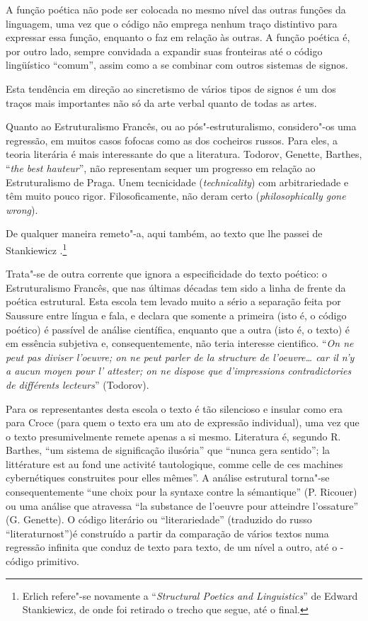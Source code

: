 A função poética não pode ser colocada no mesmo nível das outras funções
da linguagem, uma vez que o código não emprega nenhum traço distintivo
para expressar essa função, enquanto o faz em relação às outras. A
função poética é, por outro lado, sempre convidada a expandir suas
fronteiras até o código lingüístico ``comum'', assim como a se combinar
com outros sistemas de signos.

Esta tendência em direção ao sincretismo de vários tipos de signos é um
dos traços mais importantes não só da arte verbal quanto de todas as
artes.

Quanto ao Estruturalismo Francês, ou ao pós"-estruturalismo, considero"-os
uma regressão, em muitos casos fofocas como as dos cocheiros russos.
Para eles, a teoria literária é mais interessante do que a literatura.
Todorov, Genette, Barthes, ``\emph{the best hauteur}'', não representam
sequer um progresso em relação ao Estruturalismo de Praga. Unem
tecnicidade (\emph{technicality}) com arbitrariedade e têm muito pouco
rigor. Filosoficamente, não deram certo (\emph{philosophically gone
wrong}).

De qualquer maneira remeto"-a, aqui também, ao texto que lhe passei de
Stankiewicz .\footnote{Erlich refere"-se novamente a ``\emph{Structural
  Poetics and Linguistics}'' de Edward Stankiewicz, de onde foi retirado
  o trecho que segue, até o final.}

Trata"-se de outra corrente que ignora a especificidade do texto poético:
o Estruturalismo Francês, que nas últimas décadas tem sido a linha de
frente da poética estrutural. Esta escola tem levado muito a sério a
separação feita por Saussure entre língua e fala, e declara que somente
a primeira (isto é, o código poético) é passível de análise científica,
enquanto que a outra (isto é, o texto) é em essência subjetiva e,
consequentemente, não teria interesse cientifico. ``\emph{On ne peut pas
diviser l'oeuvre; on ne peut parler de la structure de l'oeuvre\ldots{}
car il n'y a aucun moyen pour l' attester; on ne dispose que
d'impressions contradictories de différents lecteurs}'' (Todorov).

Para os representantes desta escola o texto é tão silencioso e insular
como era para Croce (para quem o texto era um ato de expressão
individual), uma vez que o texto presumivelmente remete apenas a si
mesmo. Literatura é, segundo R. Barthes, ``um sistema de significação
ilusória'' que ``nunca gera sentido''; la littérature est au fond une
activité tautologique, comme celle de ces machines cybernétiques
construites pour elles mêmes''. A análise estrutural torna"-se
consequentemente ``une choix pour la syntaxe contre la sémantique'' (P.
Ricouer) ou uma análise que atravessa ``la substance de l'oeuvre pour
atteindre l'ossature'' (G. Genette). O código literário ou
``literariedade'' (traduzido do russo ``literaturnost'')é construído a
partir da comparação de vários textos numa regressão infinita que conduz
de texto para texto, de um nível a outro, até o -código primitivo.

